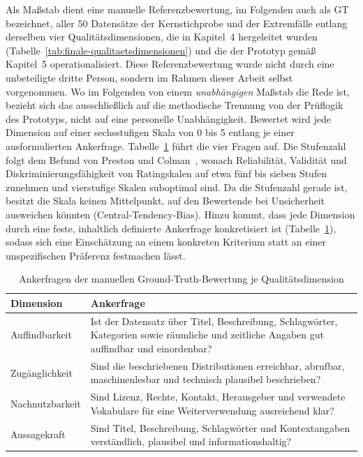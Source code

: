 Als Maßstab dient eine manuelle Referenzbewertung, im Folgenden auch als \acrfull{GT}
bezeichnet, aller 50 Datensätze der
Kernstichprobe und der Extremfälle entlang derselben vier Qualitätsdimensionen, die in
Kapitel~4 hergeleitet wurden (Tabelle~\ref{tab:finale-qualitaetsdimensionen}) und die der
Prototyp gemäß Kapitel~5 operationalisiert. Diese Referenzbewertung wurde nicht durch
eine unbeteiligte dritte Person, sondern im Rahmen dieser Arbeit selbst vorgenommen. Wo
im Folgenden von einem \emph{unabhängigen} Maßstab die Rede ist, bezieht sich das
ausschließlich auf die methodische Trennung von der Prüflogik des Prototyps, nicht auf
eine personelle Unabhängigkeit. Bewertet wird jede Dimension auf einer
sechsstufigen Skala von 0 bis 5 entlang je einer ausformulierten Ankerfrage.
Tabelle~\ref{tab:gt_anker} führt die vier Fragen auf. Die Stufenzahl folgt dem Befund von
Preston und Colman~\cite{preston2000optimal}, wonach Reliabilität, Validität und
Diskriminierungsfähigkeit von Ratingskalen auf etwa fünf bis sieben Stufen zunehmen
und vierstufige Skalen suboptimal sind. Da die Stufenzahl gerade ist, besitzt die Skala
keinen Mittelpunkt, auf den Bewertende bei Unsicherheit ausweichen könnten
(Central-Tendency-Bias). Hinzu kommt, dass jede Dimension durch eine feste, inhaltlich
definierte Ankerfrage konkretisiert ist (Tabelle~\ref{tab:gt_anker}), sodass sich eine
Einschätzung an einem konkreten Kriterium statt an einer unspezifischen Präferenz
festmachen lässt.

\begin{table}[H]
\centering
\scriptsize
\renewcommand{\arraystretch}{1.3}
\begin{tabularx}{\textwidth}{p{} X}
\hline
\textbf{Dimension} & \textbf{Ankerfrage} \\
\hline
Auffindbarkeit &
Ist der Datensatz über Titel, Beschreibung, Schlagwörter, Kategorien sowie räumliche
und zeitliche Angaben gut auffindbar und einordenbar? \\
\hline
Zugänglichkeit &
Sind die beschriebenen Distributionen erreichbar, abrufbar, maschinenlesbar und technisch
plausibel beschrieben? \\
\hline
Nachnutzbarkeit &
Sind Lizenz, Rechte, Kontakt, Herausgeber und verwendete Vokabulare für eine
Weiterverwendung ausreichend klar? \\
\hline
Aussagekraft &
Sind Titel, Beschreibung, Schlagwörter und Kontextangaben verständlich, plausibel und
informationshaltig? \\
\hline
\end{tabularx}
\caption{Ankerfragen der manuellen Ground-Truth-Bewertung je Qualitätsdimension}
\label{tab:gt_anker}
\end{table}

